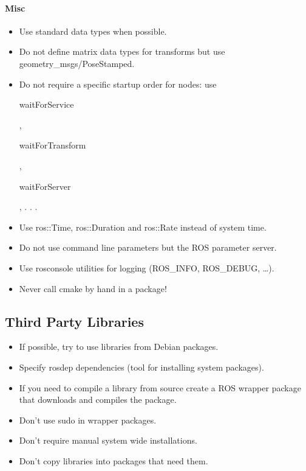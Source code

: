\paragraph{Misc}
\begin{itemize}
\item Use standard data types when possible.
\item Do not define matrix data types for transforms but use geometry\_msgs/PoseStamped.
\item Do not require a specific startup order for nodes: use \begin{tt}waitForService\end{tt}, \begin{tt}waitForTransform\end{tt}, \begin{tt}waitForServer\end{tt}, . . .
\item Use ros::Time, ros::Duration and ros::Rate instead of system time.
\item Do not use command line parameters but the ROS parameter server.
\item Use rosconsole utilities for logging (ROS\_INFO, ROS\_DEBUG, \ldots).
\item Never call cmake by hand in a package!
\end{itemize}


\subsection{Third Party Libraries}
\begin{itemize}
\item If possible, try to use libraries from Debian packages.
\item Specify rosdep dependencies (tool for installing system packages).
\item If you need to compile a library from source create a ROS wrapper
package that downloads and compiles the package.
\item Don't use sudo in wrapper packages.
\item Don't require manual system wide installations.
\item Don't copy libraries into packages that need them.
\end{itemize}


